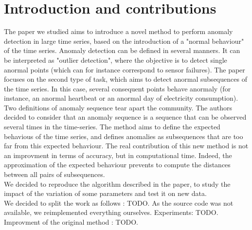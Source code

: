 \documentclass[11pt]{article}
\begin{document}

\section{Introduction and contributions}
The paper we studied aims to introduce a novel method to perform anomaly detection in large time series, based on the introduction of a "normal behaviour" of the time series.
Anomaly detection can be defined in several manners. 
It can be interpreted as "outlier detection", where the objective is to detect single anormal points (which can for instance correspond to sensor failures). 
The paper focuses on the second type of task, which aims to detect anormal subsequences of the time series. 
In this case, several consequent points behave anormaly (for instance, an anormal heartbeat or an anormal day of electricity consumption).
Two definitions of anomaly sequence tear apart the community.
The authors decided to consider that an anomaly sequence is a sequence that can be observed several times in the time-series. 
The method aims to define the expected behavious of the time series, and defines anomalies as subsequences that are too far from this expected behaviour.
The real contribution of this new method is not an improvment in terms of accuracy, but in computational time. 
Indeed, the approximation of the expected behaviour prevents to compute the distances between all pairs of subsequences. \\
We decided to reproduce the algorithm described in the paper, to study the impact of the variation of some parameters and test it on new data. \\
We decided to split the work as follows : TODO. 
As the source code was not available, we reimplemented everything ourselves. 
Experiments: TODO.
Improvment of the original method : TODO.
\end{document}
